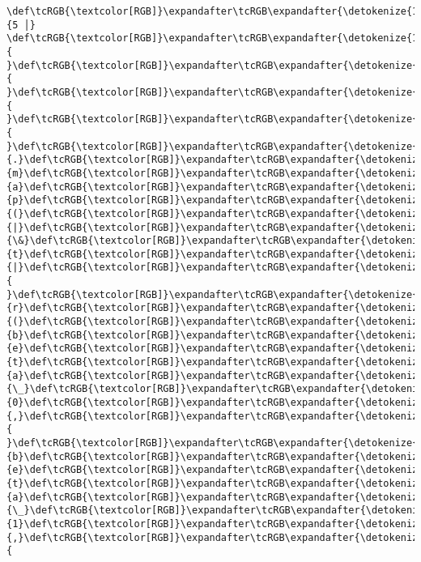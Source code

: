 \documentclass[11pt]{article}
\begin{document}
\begin{Verbatim}[commandchars=\\\{\}, frame=single, framerule=2mm, rulecolor=\color{outerrorbackground}]
 \def\tcRGB{\textcolor[RGB]}\expandafter\tcRGB\expandafter{\detokenize{148,148,148}}{5 │} \def\tcRGB{\textcolor[RGB]}\expandafter\tcRGB\expandafter{\detokenize{178,178,178}}{ }\def\tcRGB{\textcolor[RGB]}\expandafter\tcRGB\expandafter{\detokenize{178,178,178}}{ }\def\tcRGB{\textcolor[RGB]}\expandafter\tcRGB\expandafter{\detokenize{178,178,178}}{ }\def\tcRGB{\textcolor[RGB]}\expandafter\tcRGB\expandafter{\detokenize{178,178,178}}{ }\def\tcRGB{\textcolor[RGB]}\expandafter\tcRGB\expandafter{\detokenize{178,178,178}}{.}\def\tcRGB{\textcolor[RGB]}\expandafter\tcRGB\expandafter{\detokenize{178,178,178}}{m}\def\tcRGB{\textcolor[RGB]}\expandafter\tcRGB\expandafter{\detokenize{178,178,178}}{a}\def\tcRGB{\textcolor[RGB]}\expandafter\tcRGB\expandafter{\detokenize{178,178,178}}{p}\def\tcRGB{\textcolor[RGB]}\expandafter\tcRGB\expandafter{\detokenize{178,178,178}}{(}\def\tcRGB{\textcolor[RGB]}\expandafter\tcRGB\expandafter{\detokenize{178,178,178}}{|}\def\tcRGB{\textcolor[RGB]}\expandafter\tcRGB\expandafter{\detokenize{178,178,178}}{\&}\def\tcRGB{\textcolor[RGB]}\expandafter\tcRGB\expandafter{\detokenize{178,178,178}}{t}\def\tcRGB{\textcolor[RGB]}\expandafter\tcRGB\expandafter{\detokenize{178,178,178}}{|}\def\tcRGB{\textcolor[RGB]}\expandafter\tcRGB\expandafter{\detokenize{178,178,178}}{ }\def\tcRGB{\textcolor[RGB]}\expandafter\tcRGB\expandafter{\detokenize{178,178,178}}{r}\def\tcRGB{\textcolor[RGB]}\expandafter\tcRGB\expandafter{\detokenize{178,178,178}}{(}\def\tcRGB{\textcolor[RGB]}\expandafter\tcRGB\expandafter{\detokenize{178,178,178}}{b}\def\tcRGB{\textcolor[RGB]}\expandafter\tcRGB\expandafter{\detokenize{178,178,178}}{e}\def\tcRGB{\textcolor[RGB]}\expandafter\tcRGB\expandafter{\detokenize{178,178,178}}{t}\def\tcRGB{\textcolor[RGB]}\expandafter\tcRGB\expandafter{\detokenize{178,178,178}}{a}\def\tcRGB{\textcolor[RGB]}\expandafter\tcRGB\expandafter{\detokenize{178,178,178}}{\_}\def\tcRGB{\textcolor[RGB]}\expandafter\tcRGB\expandafter{\detokenize{178,178,178}}{0}\def\tcRGB{\textcolor[RGB]}\expandafter\tcRGB\expandafter{\detokenize{178,178,178}}{,}\def\tcRGB{\textcolor[RGB]}\expandafter\tcRGB\expandafter{\detokenize{178,178,178}}{ }\def\tcRGB{\textcolor[RGB]}\expandafter\tcRGB\expandafter{\detokenize{95,0,135}}{b}\def\tcRGB{\textcolor[RGB]}\expandafter\tcRGB\expandafter{\detokenize{95,0,135}}{e}\def\tcRGB{\textcolor[RGB]}\expandafter\tcRGB\expandafter{\detokenize{95,0,135}}{t}\def\tcRGB{\textcolor[RGB]}\expandafter\tcRGB\expandafter{\detokenize{95,0,135}}{a}\def\tcRGB{\textcolor[RGB]}\expandafter\tcRGB\expandafter{\detokenize{95,0,135}}{\_}\def\tcRGB{\textcolor[RGB]}\expandafter\tcRGB\expandafter{\detokenize{95,0,135}}{1}\def\tcRGB{\textcolor[RGB]}\expandafter\tcRGB\expandafter{\detokenize{178,178,178}}{,}\def\tcRGB{\textcolor[RGB]}\expandafter\tcRGB\expandafter{\detokenize{178,178,178}}{ 
\end{Verbatim}
\end{document}
